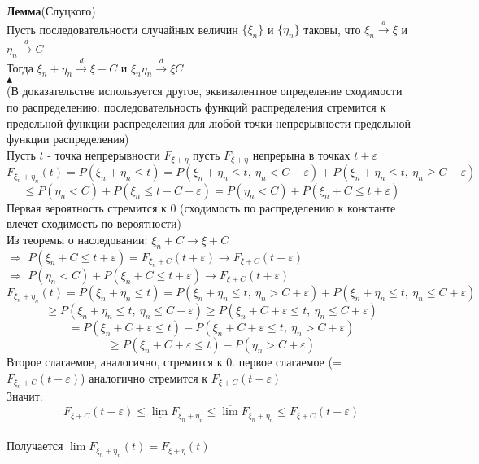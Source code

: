 \documentclass[25pt]{article}
\begin{document}
\textbf{Лемма}(Слуцкого) \\
Пусть последовательности случайных величин $\{\xi_n\}$ и $\{\eta_n\}$ таковы, что
$\xi_n \xrightarrow{d} \xi$ и $\eta_n \xrightarrow{d} C$\\
Тогда $\xi_n + \eta_n \xrightarrow{d} \xi + C$ и $\xi_n\eta_n \xrightarrow{d} \xi C$
\\
$\blacktriangle$
\\
(В доказательстве используется другое, эквивалентное определение сходимости по распределению: последовательность функций распределения стремится к предельной функции распределения для любой точки непрерывности предельной функции распределения)
\\
Пусть $t$ - точка непрерывности $F_{\xi + \eta}$ пусть $F_{\xi + \eta}$ непрерына в точках $t \pm \varepsilon$
$$ F_{\xi_n + \eta_n}(t) = P(\xi_n + \eta_n \leq t) = P(\xi_n + \eta_n \leq t,\ \eta_n < C - \varepsilon) + P(\xi_n + \eta_n \leq t,\ \eta_n \geq C - \varepsilon) $$ $$ \leq P(\eta_n < C) + P(\xi_n \leq t - C + \varepsilon) = P(\eta_n < C) + P(\xi_n + C \leq t + \varepsilon)$$
Первая вероятность стремится к 0 (сходимость по распределению к константе влечет сходимость по вероятности)
\\
Из теоремы о наследовании: $\xi_n + C \rightarrow \xi + C$ 
\\
$\Rightarrow$ $P(\xi_n + C \leq t + \varepsilon) = F_{\xi_n + C}(t + \varepsilon) \rightarrow F_{\xi + C}(t + \varepsilon)$
\\
$\Rightarrow$ $P(\eta_n < C) + P(\xi_n + C \leq t + \varepsilon) \rightarrow F_{\xi + C}(t + \varepsilon)$
\\
$$ F_{\xi_n + \eta_n}(t) = P(\xi_n + \eta_n \leq t) = P(\xi_n + \eta_n \leq t,\ \eta_n > C + \varepsilon) + P(\xi_n + \eta_n \leq t,\ \eta_n \leq C + \varepsilon)$$
$$ \geq  P(\xi_n + \eta_n \leq t,\ \eta_n \leq C + \varepsilon) \geq  P(\xi_n + C + \varepsilon \leq t,\ \eta_n \leq C + \varepsilon)$$
$$ =  P(\xi_n + C + \varepsilon \leq t) - P(\xi_n + C + \varepsilon \leq t,\ \eta_n > C + \varepsilon) $$
$$ \geq P(\xi_n + C + \varepsilon \leq t) - P(\eta_n > C + \varepsilon)$$
Второе слагаемое, аналогично, стремится к 0. первое слагаемое (= $F_{\xi_n + C}(t - \varepsilon)$) аналогично стремится к $F_{\xi + C}(t - \varepsilon)$
\\
Значит: 
$$ F_{\xi + C}(t-\varepsilon) \leq \underline{\lim} F_{\xi_n + \eta_n} \leq \overline{\lim} F_{\xi_n + \eta_n} \leq F_{\xi + C}(t + \varepsilon) $$
\\
Получается $\lim F_{\xi_n + \eta_n}(t) = F_{\xi + \eta}(t)$
\end{document}

